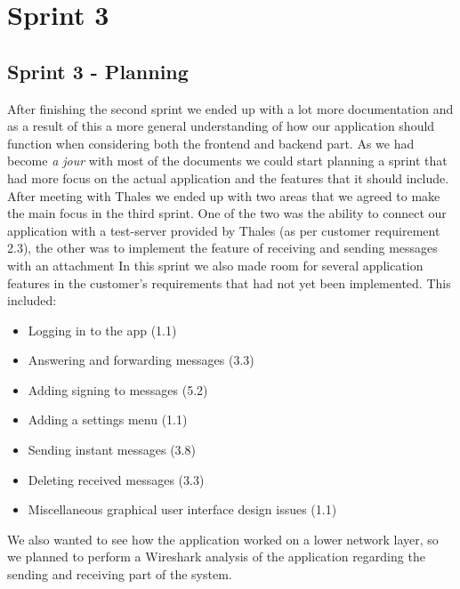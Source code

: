 \chapter{Sprint 3}

\section{Sprint 3 - Planning}
After finishing the second sprint we ended up with a lot more documentation and as a result of this a more general understanding of how our application should function when considering both the frontend and backend part. As we had become \textit{a jour} with most of the documents we could start planning a sprint that had more focus on the actual application and the features that it should include. 
\newline
\newline
After meeting with Thales we ended up with two areas that we agreed to make the main focus in the third sprint. One of the two was the ability to connect our application with a test-server provided by Thales (as per customer requirement 2.3), the other was to implement the feature of receiving and sending messages with an attachment
\newline
\newline
In this sprint we also made room for several application features in the customer's requirements that had not yet been implemented. This included:
\begin{itemize}
\item{}Logging in to the app (1.1)
\item{}Answering and forwarding messages (3.3)
\item{}Adding signing to messages (5.2)
\item{}Adding a settings menu (1.1)
\item{}Sending instant messages (3.8)
\item{}Deleting received messages (3.3)
\item{}Miscellaneous graphical user interface design issues (1.1)
\end{itemize}

We also wanted to see how the application worked on a lower network layer, so we planned to perform a Wireshark analysis of the application regarding the sending and receiving part of the system. 

\newpage


